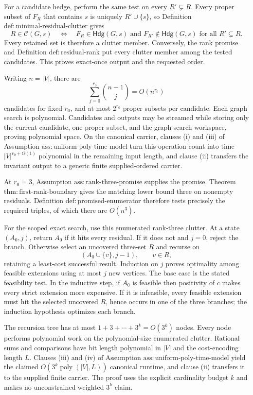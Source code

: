 For a candidate hedge, perform the same test on every
\(R'\subsetneq R\).  Every proper subset of \(F_R\) that contains \(s\)
is uniquely \(R'\cup\{s\}\), so Definition
\(\mathrm{def{:}minimal\mbox{-}residual\mbox{-}clutter}\) gives
\[
 R\in\mathcal C(G,s)
 \quad\Longleftrightarrow\quad
 F_R\in\mathsf{Hdg}(G,s)
 \text{ and }F_{R'}\notin\mathsf{Hdg}(G,s)
 \text{ for all }R'\subsetneq R.
\]
Every retained set is therefore a clutter member.  Conversely, the rank
promise and Definition \(\mathrm{def{:}residual\mbox{-}rank}\) put every
clutter member among the tested candidates.  This proves exact-once output
and the requested order.

Writing \(n=|V|\), there are
\[
 \sum_{j=0}^{r_0}\binom{n-1}{j}=O(n^{r_0})
\]
candidates for fixed \(r_0\), and at most \(2^{r_0}\) proper subsets per
candidate.  Each graph search is polynomial.  Candidates and outputs may be
streamed while storing only the current candidate, one proper subset, and
the graph-search workspace, proving polynomial space.  On the canonical
carrier, clauses (i) and (iii) of Assumption
\(\mathrm{ass{:}uniform\mbox{-}poly\mbox{-}time\mbox{-}model}\) turn this
operation count into time \(|V|^{r_0+O(1)}\) polynomial in the remaining
input length, and clause (ii) transfers the invariant output to a generic
finite supplied-ordered carrier.

At \(r_0=3\), Assumption
\(\mathrm{ass{:}rank\mbox{-}three\mbox{-}promise}\) supplies the promise.
Theorem \(\mathrm{thm{:}first\mbox{-}rank\mbox{-}boundary}\) gives the
matching lower bound three on nonempty residuals.  Definition
\(\mathrm{def{:}promised\mbox{-}enumerator}\) therefore tests precisely
the required triples, of which there are \(O(n^3)\).

For the scoped exact search, use this enumerated rank-three clutter.  At a
state \((A_0,j)\), return \(A_0\) if it hits every residual.  If it does
not and \(j=0\), reject the branch.  Otherwise select an uncovered
three-set \(R\) and recurse on
\[
 (A_0\cup\{v\},j-1),\qquad v\in R,
\]
retaining a least-cost successful result.  Induction on \(j\) proves
optimality among feasible extensions using at most \(j\) new vertices.
The base case is the stated feasibility test.  In the inductive step, if
\(A_0\) is feasible then positivity of \(c\) makes every strict extension
more expensive.  If it is infeasible, every feasible extension must hit
the selected uncovered \(R\), hence occurs in one of the three branches;
the induction hypothesis optimizes each branch.

The recursion tree has at most
\(1+3+\cdots+3^k=O(3^k)\) nodes.  Every node performs polynomial work on
the polynomial-size enumerated clutter.  Rational sums and comparisons have
bit length polynomial in \(|V|\) and the cost-encoding length \(L\).
Clauses (iii) and (iv) of Assumption
\(\mathrm{ass{:}uniform\mbox{-}poly\mbox{-}time\mbox{-}model}\) yield the
claimed \(O(3^k\operatorname{poly}(|V|,L))\) canonical runtime, and clause
(ii) transfers it to the supplied finite carrier.  The proof uses the
explicit cardinality budget \(k\) and makes no unconstrained weighted
\(3^k\) claim.

